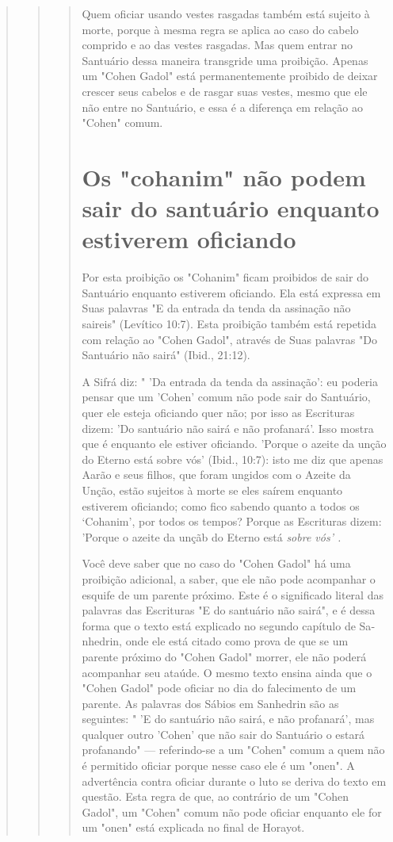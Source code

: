 \begin{quote}
\begin{quote}
\begin{quote}
Quem oficiar usando vestes rasgadas também está sujeito à morte, porque
à mesma regra se aplica ao caso do cabelo comprido e ao das vestes
rasgadas. Mas quem entrar no Santuário dessa maneira transgride uma
proibi­ção. Apenas um "Cohen Gadol" está permanentemente proibido de
deixar cres­cer seus cabelos e de rasgar suas vestes, mesmo que ele não
entre no Santuário, e essa é a diferença em relação ao "Cohen" comum.

\section{Os "cohanim" não podem sair do santuário enquanto estiverem oficiando}

Por esta proibição os "Cohanim" ficam proibidos de sair do Santuá­rio
enquanto estiverem oficiando. Ela está expressa em Suas palavras "E da
en­trada da tenda da assinação não saireis" (Levítico 10:7). Esta
proibição também está repetida com relação ao "Cohen Gadol", através de
Suas palavras "Do San­tuário não sairá" (Ibid., 21:12).

A Sifrá diz: " 'Da entrada da tenda da assinação': eu poderia pensar que
um 'Cohen' comum não pode sair do Santuário, quer ele esteja oficiando
quer não; por isso as Escrituras dizem: 'Do santuário não sairá e não
profanará'. Isso mostra que é enquanto ele estiver oficiando. 'Porque o
azeite da unção do Eterno está sobre vós' (Ibid., 10:7): isto me diz que
apenas Aarão e seus fi­lhos, que foram ungidos com o Azeite da Unção,
estão sujeitos à morte se eles saírem enquanto estiverem oficiando; como
fico sabendo quanto a todos os `Cohanim', por todos os tempos? Porque as
Escrituras dizem: 'Porque o azeite da unçãb do Eterno está \emph{sobre
vós' .}

Você deve saber que no caso do "Cohen Gadol" há uma proibição adicional,
a saber, que ele não pode acompanhar o esquife de um parente pró­ximo.
Este é o significado literal das palavras das Escrituras "E do santuário
não sairá", e é dessa forma que o texto está explicado no segundo
capítulo de Sa­nhedrin, onde ele está citado como prova de que se um
parente próximo do "Cohen Gadol" morrer, ele não poderá acompanhar seu
ataúde. O mesmo tex­to ensina ainda que o "Cohen Gadol" pode oficiar no
dia do falecimento de um parente. As palavras dos Sábios em Sanhedrin
são as seguintes: " 'E do san­tuário não sairá, e não profanará', mas
qualquer outro 'Cohen' que não sair do Santuário o estará profanando"
--- referindo-se a um "Cohen" comum a quem não é permitido oficiar
porque nesse caso ele é um "onen". A advertência con­tra oficiar durante
o luto se deriva do texto em questão. Esta regra de que, ao contrário de
um "Cohen Gadol", um "Cohen" comum não pode oficiar en­quanto ele for um
"onen" está explicada no final de Horayot.
\end{quote}


\end{quote}
\end{quote}

